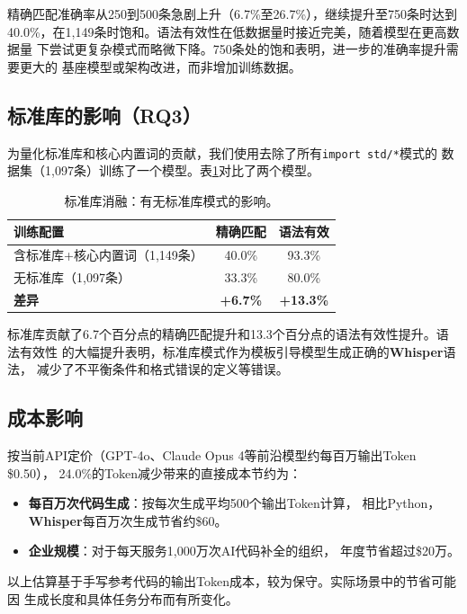 \documentclass[11pt,a4paper]{ctexart}
\begin{document}
精确匹配准确率从250到500条急剧上升（6.7\%至26.7\%），继续提升至750条时达到
40.0\%，在1,149条时饱和。语法有效性在低数据量时接近完美，随着模型在更高数据量
下尝试更复杂模式而略微下降。750条处的饱和表明，进一步的准确率提升需要更大的
基座模型或架构改进，而非增加训练数据。

\subsection{标准库的影响（RQ3）}

为量化标准库和核心内置词的贡献，我们使用去除了所有\texttt{import std/*}模式的
数据集（1,097条）训练了一个模型。表\ref{tab:stdlib}对比了两个模型。

\begin{table}[ht]
\centering
\caption{标准库消融：有无标准库模式的影响。}
\label{tab:stdlib}
\begin{tabular}{lcc}
\toprule
\textbf{训练配置} & \textbf{精确匹配} & \textbf{语法有效} \\
\midrule
含标准库+核心内置词（1,149条） & 40.0\% & 93.3\%  \\
无标准库（1,097条）             & 33.3\% & 80.0\%  \\
\midrule
\textbf{差异}                   & \textbf{+6.7\%} & \textbf{+13.3\%} \\
\bottomrule
\end{tabular}
\end{table}

标准库贡献了6.7个百分点的精确匹配提升和13.3个百分点的语法有效性提升。语法有效性
的大幅提升表明，标准库模式作为模板引导模型生成正确的\textbf{Whisper}语法，
减少了不平衡条件和格式错误的定义等错误。

\subsection{成本影响}

按当前API定价（GPT-4o、Claude Opus 4等前沿模型约每百万输出Token \$0.50），
24.0\%的Token减少带来的直接成本节约为：

\begin{itemize}
\item \textbf{每百万次代码生成}：按每次生成平均500个输出Token计算，
  相比Python，\textbf{Whisper}每百万次生成节省约\$60。
\item \textbf{企业规模}：对于每天服务1,000万次AI代码补全的组织，
  年度节省超过\$20万。
\end{itemize}

以上估算基于手写参考代码的输出Token成本，较为保守。实际场景中的节省可能因
生成长度和具体任务分布而有所变化。
\end{document}
